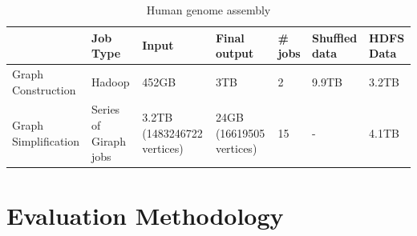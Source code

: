\documentclass[conference]{IEEEtran}
\begin{document}
\begin{table}
\begin{center}
    \begin{tabular}{ |p{1.1cm} | p{0.8cm} | p{1.1cm} | p{0.8cm} | p{0.8cm} | p{0.8cm} | p{0.8cm}|} \hline
    & Job Type & Input & Final output & \# jobs & Shuffled data & HDFS Data \\ \hline
    Graph Construction & Hadoop & 452GB & 3TB & 2 & 9.9TB & 3.2TB \\ \hline
    Graph Simplification & Series of Giraph jobs & 3.2TB (1483246722 vertices) & 24GB (16619505 vertices) & 15 & - & 4.1TB \\ \hline    
    \end{tabular}
    \caption{Human genome assembly}
	\label{table:HumanData}
\end{center}
\end{table}

\section {Evaluation Methodology} \label{Evaluation Methodology}
\end{document}
